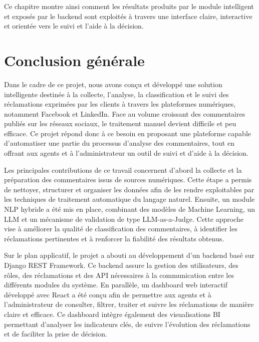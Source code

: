 \documentclass[12pt,a4paper,oneside]{report}
\begin{document}
Ce chapitre montre ainsi comment les résultats produits par le module 
intelligent et exposés par le backend sont exploités à travers une interface 
claire, interactive et orientée vers le suivi et l’aide à la décision.

\chapter*{Conclusion générale}

Dans le cadre de ce projet, nous avons conçu et développé une solution intelligente destinée à la collecte, l’analyse, la classification et le suivi des réclamations exprimées par les clients à travers les plateformes numériques, notamment Facebook et LinkedIn. Face au volume croissant des commentaires publiés sur les réseaux sociaux, le traitement manuel devient difficile et peu efficace. Ce projet répond donc à ce besoin en proposant une plateforme capable d’automatiser une partie du processus d’analyse des commentaires, tout en offrant aux agents et à l’administrateur un outil de suivi et d’aide à la décision.

Les principales contributions de ce travail concernent d’abord la collecte et la préparation des commentaires issus de sources numériques. Cette étape a permis de nettoyer, structurer et organiser les données afin de les rendre exploitables par les techniques de traitement automatique du langage naturel. Ensuite, un module NLP hybride a été mis en place, combinant des modèles de Machine Learning, un LLM et un mécanisme de validation de type LLM-as-a-Judge. Cette approche vise à améliorer la qualité de classification des commentaires, à identifier les réclamations pertinentes et à renforcer la fiabilité des résultats obtenus.

Sur le plan applicatif, le projet a abouti au développement d’un backend basé sur Django REST Framework. Ce backend assure la gestion des utilisateurs, des rôles, des réclamations et des API nécessaires à la communication entre les différents modules du système. En parallèle, un dashboard web interactif développé avec React a été conçu afin de permettre aux agents et à l’administrateur de consulter, filtrer, traiter et suivre les réclamations de manière claire et efficace. Ce dashboard intègre également des visualisations BI permettant d’analyser les indicateurs clés, de suivre l’évolution des réclamations et de faciliter la prise de décision.
\end{document}
